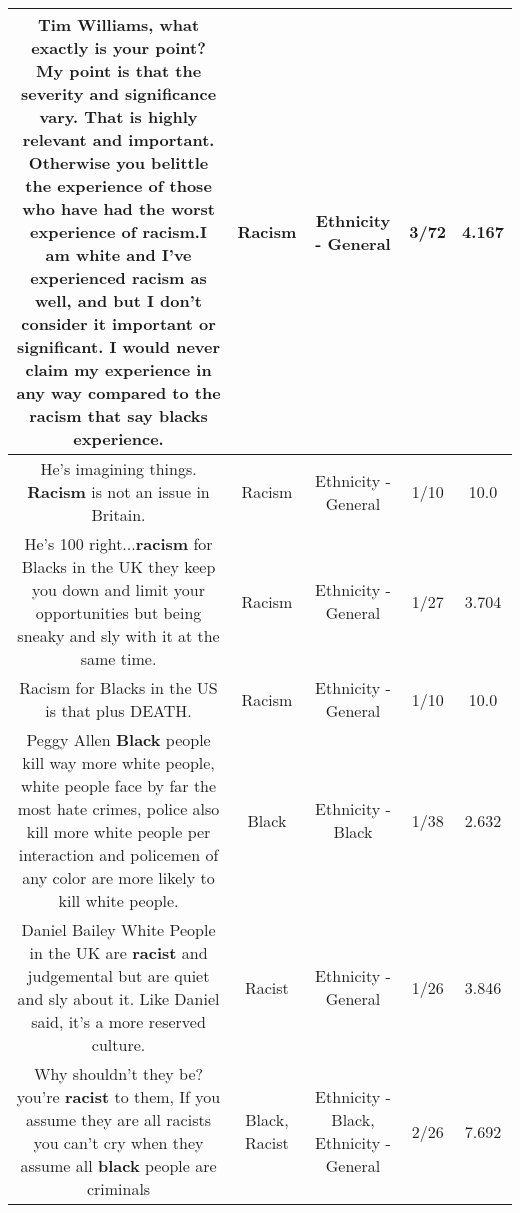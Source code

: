 \documentclass[11pt]{article}
\newlength\mylength
\begin{document}
\begin{center}
\begin{longtable}{|C{.65\mylength}|C{.30\mylength}|C{.12\mylength}|C{.12\mylength}|C{.12\mylength}|}
  \small Tim Williams, what exactly is your point? My point is that the severity and significance vary. That is highly relevant and important. Otherwise you belittle the experience of those who have had the worst experience of \textbf{racism}.I am white and I've experienced \textbf{racism} as well, and but I don't consider it important or significant. I would never claim my experience in any way compared to the \textbf{racism} that say blacks experience.\normalsize   & Racism & Ethnicity - General & 3/72 & 4.167 \\  \hline
  \small He's imagining things. \textbf{Racism} is not an issue in Britain.\normalsize   & Racism & Ethnicity - General & 1/10 & 10.0 \\  \hline
  \small He's 100 right...\textbf{racism} for Blacks in the UK they keep you down and limit your opportunities but being sneaky and sly with it at the same time.\normalsize   & Racism & Ethnicity - General & 1/27 & 3.704 \\  \hline
  \small Racism for Blacks in the US is that plus DEATH.\normalsize   & Racism & Ethnicity - General & 1/10 & 10.0 \\  \hline
  \small Peggy Allen \textbf{Black} people kill way more white people, white people face by far the most hate crimes, police also kill more white people per interaction and policemen of any color are more likely to kill white people.\normalsize   & Black & Ethnicity - Black & 1/38 & 2.632 \\  \hline
  \small Daniel Bailey White People in the UK are \textbf{racist} and judgemental but are quiet and sly about it. Like Daniel said, it's a more reserved culture.\normalsize   & Racist & Ethnicity - General & 1/26 & 3.846 \\  \hline
  \small Why shouldn't they be? you're \textbf{racist} to them, If you assume they are all racists you can't cry when they assume all \textbf{black} people are criminals\normalsize   & Black, Racist & Ethnicity - Black, Ethnicity - General & 2/26 & 7.692 \\  \hline

\end{longtable}
\end{center}
\end{document}
